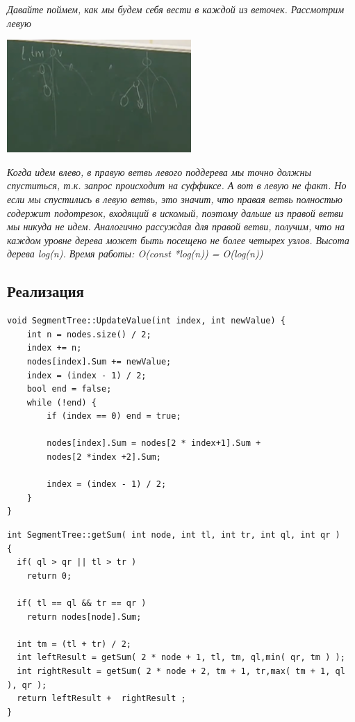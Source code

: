 \begin{itemize}
\textit{Давайте поймем, как мы будем себя вести в каждой из веточек. Рассмотрим левую}

\includegraphics[width = 7cm]{images/60-62_assimpt2}

\textit{Когда идем влево, в правую ветвь левого поддерева мы точно должны спуститься, т.к. запрос происходит на суффиксе. А вот в левую не факт. Но если мы спустились в левую ветвь, это значит, что правая ветвь полностью содержит подотрезок, входящий в искомый, поэтому дальше из правой ветви мы никуда не идем. Аналогично рассуждая для правой ветви, получим, что на каждом уровне дерева может быть посещено не более четырех узлов. Высота дерева log(n). Время работы: O(const *log(n)) = O(log(n)) }

\end{itemize}

\subsection*{Реализация}

\begin{lstlisting}
void SegmentTree::UpdateValue(int index, int newValue) {
	int n = nodes.size() / 2;
	index += n;
	nodes[index].Sum += newValue;
	index = (index - 1) / 2;
	bool end = false;
	while (!end) {
		if (index == 0) end = true;

		nodes[index].Sum = nodes[2 * index+1].Sum +
		nodes[2 *index +2].Sum;
		
		index = (index - 1) / 2;
	}
}
\end{lstlisting}
\begin{lstlisting}
int SegmentTree::getSum( int node, int tl, int tr, int ql, int qr )
{
  if( ql > qr || tl > tr )
    return 0;

  if( tl == ql && tr == qr )
    return nodes[node].Sum;

  int tm = (tl + tr) / 2;
  int leftResult = getSum( 2 * node + 1, tl, tm, ql,min( qr, tm ) );
  int rightResult = getSum( 2 * node + 2, tm + 1, tr,max( tm + 1, ql ), qr );
  return leftResult +  rightResult ;
}
\end{lstlisting}


